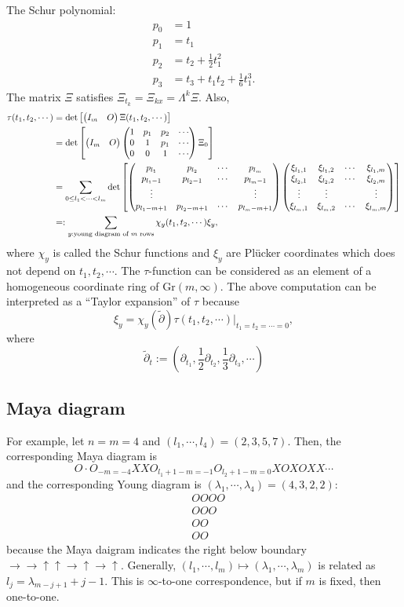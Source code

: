 \documentclass{../../../small}
\newcommand{\Gr}{\mathrm{Gr}}
\begin{document}
The Schur polynomial:
\begin{align*}
p_0&=1\\
p_1&=t_1\\
p_2&=t_2+\frac12t_1^2\\
p_3&=t_3+t_1t_2+\frac16t_1^3.
\end{align*}
The matrix $\Xi$ satisfies $\Xi_{t_k}=\Xi_{kx}=\Lambda^k\Xi$.
Also,
\begin{align*}
\tau(t_1,t_2,\cdots)
&=\det\left[\begin{pmatrix}I_m&O\end{pmatrix}\Xi(t_1,t_2,\cdots)\right]\\
&=\det\left[\begin{pmatrix}I_m&O\end{pmatrix}\begin{pmatrix}1&p_1&p_2&\cdots\\0&1&p_1&\cdots\\0&0&1&\cdots\end{pmatrix}\Xi_0\right]\\
&=\sum_{0\le l_1<\cdots<l_m}\det\left[
\begin{pmatrix}p_{l_1}&p_{l_2}&\cdots&p_{l_m}\\p_{l_1-1}&p_{l_2-1}&\cdots&p_{l_m-1}\\\vdots&&&\vdots\\p_{l_1-m+1}&p_{l_2-m+1}&\cdots&p_{l_m-m+1}\\\end{pmatrix}
\begin{pmatrix}\xi_{l_1,1}&\xi_{l_1,2}&\cdots&\xi_{l_1,m}\\\xi_{l_2,1}&\xi_{l_2,2}&\cdots&\xi_{l_2,m}\\\vdots&\vdots&&\vdots\\\xi_{l_m,1}&\xi_{l_m,2}&\cdots&\xi_{l_m,m}\\\end{pmatrix}
\right]\\
&=:\sum_{y:\text{young diagram of $m$ rows}}\chi_y(t_1,t_2,\cdots)\xi_y,
\end{align*}
where $\chi_y$ is called the Schur functions and $\xi_y$ are Pl\"ucker coordinates which does not depend on $t_1,t_2,\cdots$.
The $\tau$-function can be considered as an element of a homogeneous coordinate ring of $\Gr(m,\infty)$.
The above computation can be interpreted as a ``Taylor expansion'' of $\tau$ because
\[\xi_y=\chi_y(\tilde\partial)\tau(t_1,t_2,\cdots)|_{t_1=t_2=\cdots=0},\]
where
\[\tilde\partial_t:=(\partial_{t_1},\frac12\partial_{t_2},\frac13\partial_{t_3},\cdots)\]



\subsection*{Maya diagram}

For example, let $n=m=4$ and $(l_1,\cdots,l_4)=(2,3,5,7)$.
Then, the corresponding Maya diagram is
\[O\cdot O_{-m=-4}XXO_{l_1+1-m=-1}O_{l_2+1-m=0}XOXOXX\cdots\]
and the corresponding Young diagram is $(\lambda_1,\cdots,\lambda_4)=(4,3,2,2)$:
\begin{align*}
&OOOO\\
&OOO\\
&OO\\
&OO
\end{align*}
because the Maya daigram indicates the right below boundary $\to\to\uparrow\uparrow\to\uparrow\to\uparrow$.
Generally, $(l_1,\cdots,l_m)\mapsto(\lambda_1,\cdots,\lambda_m)$ is related as $l_j=\lambda_{m-j+1}+j-1$.
This is $\infty$-to-one correspondence, but if $m$ is fixed, then one-to-one.
\end{document}
